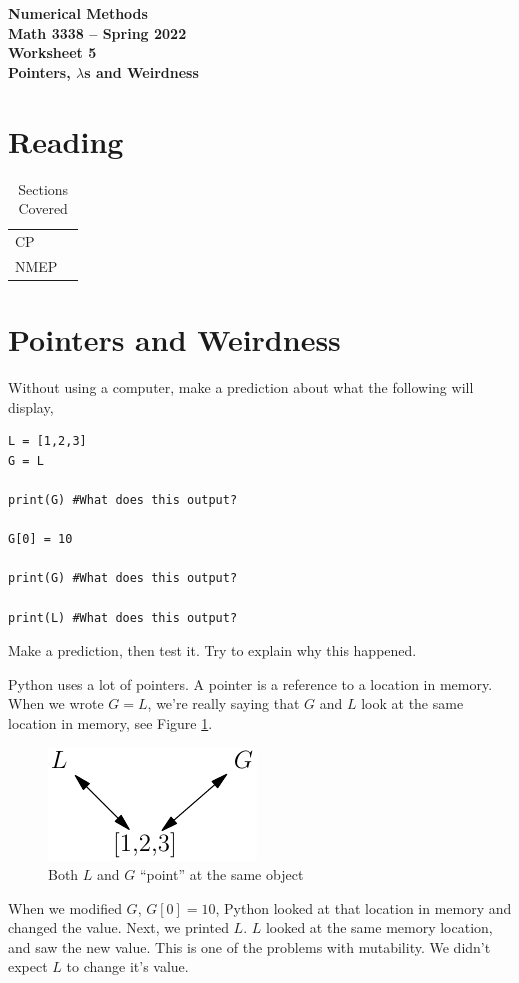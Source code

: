 \documentclass[11pt,letterpaper]{article}
\newcommand{\semester}{Spring 2022}
\begin{document}
\begin{center}
{\huge{\bf  Numerical Methods}} \\[1.5ex]
{\bf Math 3338 -- \semester}\\[1.5ex]
{\Large{\bf Worksheet 5\ \\[2ex] Pointers, $\lambda$s and Weirdness}}\\
\end{center}
\vspace{2mm}

\section{Reading}

\begin{table}[!ht]
 \centering
 \begin{tabular}{ll}
   CP &  \\
 NMEP & 
 \end{tabular}
\caption{Sections Covered}
\end{table}


\section{Pointers and Weirdness}
Without using a computer, make a prediction about what the following will display,
\begin{verbatim}
L = [1,2,3]
G = L

print(G) #What does this output?

G[0] = 10

print(G) #What does this output?

print(L) #What does this output?

\end{verbatim}
Make a prediction, then test it. Try to explain why this happened.

Python uses a lot of pointers. A pointer is a reference to a location in memory. When we wrote 
$G=L$, we're really saying that $G$ and $L$ look at the same location in memory, see Figure 
\ref{fig:pointer}.
\begin{figure}[!ht]
 \centering
 \includegraphics{images/pointer.pdf}
 \caption{Both $L$ and $G$ ``point'' at the same object}
 \label{fig:pointer}
\end{figure}    
When we modified $G$, $G[0]=10$, Python looked at that location in memory and changed the value. 
Next, we printed $L$. $L$ looked at the same memory location, and saw the new value. This is one
of the problems with mutability. We didn't expect $L$ to change it's value.
\end{document}
